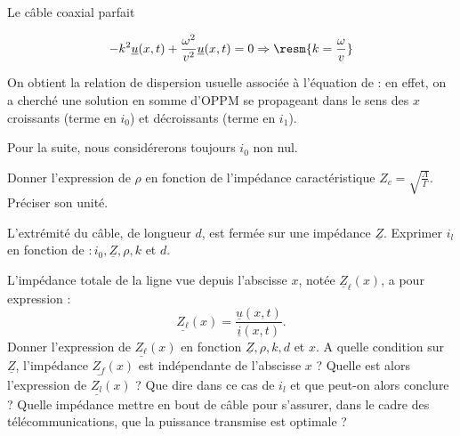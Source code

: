 \begin{exo}[PC][1][devoir]{Le câble coaxial parfait}
\begin{quest}
{  $$-k^2\underline u(x,t)+\frac{\omega^2}{v^2}\underline u(x,t)=0\Rightarrow \resm{k=\frac{\omega}{v}}$$

  On obtient la relation de dispersion usuelle associée à l'équation de  : en effet, on a cherché une solution en somme d'OPPM se propageant dans le sens des $x$ croissants (terme en $i_0$) et décroissants (terme en $i_1$).

  }
\end{quest}


Pour la suite, nous considérerons toujours $i_{0}$ non nul.
\begin{quest}
  \item
   Donner l'expression de $\rho$ en fonction de l'impédance caractéristique $Z_{c}=\sqrt{\frac{\Lambda}{\Gamma}}$. Préciser son unité.
   \item L'extrémité du câble, de longueur $d$, est fermée sur une impédance $\underline{Z}$. Exprimer $i_{l}$ en fonction de $: i_{0}, \underline{Z}, \rho, k$ et $d$.
   \item L'impédance totale de la ligne vue depuis l'abscisse $x$, notée $\underline{Z}_{\ell}(x)$, a pour expression : $$\underline{Z_{\ell}}(x)=\frac{\underline{u}(x, t)}{\underline{i}(x, t)}.$$ Donner l'expression de $\underline{Z_{\ell}}(x)$ en fonction $\underline{Z}, \rho, k, d$ et $x$. A quelle condition sur $\underline{Z}$, l'impédance $\underline{Z_{f}}(x)$ est indépendante de l'abscisse $x$ ? Quelle est alors l'expression de $\underline{Z_{l}}(x)$ ? Que dire dans ce cas de $i_{l}$ et que peut-on alors conclure ? Quelle impédance mettre en bout de câble pour s'assurer, dans le cadre des télécommunications, que la puissance transmise est optimale ?
\end{quest}
\end{exo}
